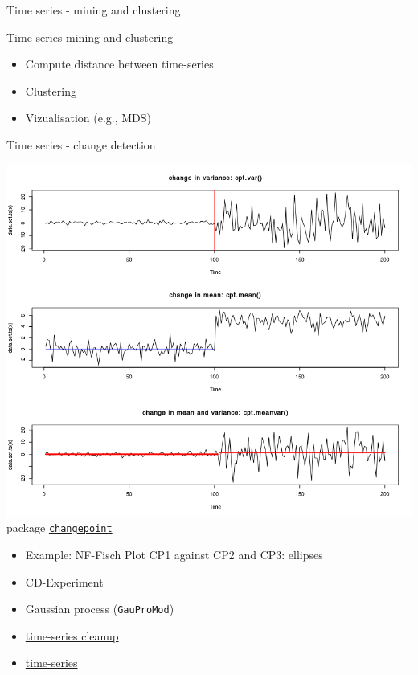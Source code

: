 \documentclass[9pt,ignorenonframetext,]{beamer}
\providecommand{\tightlist}{%
  \setlength{\itemsep}{0pt}\setlength{\parskip}{0pt}}
\begin{document}
\begin{frame}{Time series - mining and clustering}

\href{https://rdatamining.wordpress.com/2011/08/23/time-series-analysis-and-mining-with-r/}{Time
series mining and clustering}

\begin{itemize}
\tightlist
\item
  Compute distance between time-series
\item
  Clustering
\item
  Vizualisation (e.g., MDS)
\end{itemize}

\end{frame}

\begin{frame}[fragile]{Time series - change detection}

\includegraphics{imgPres/TS_changedetection.png} package
\href{https://cran.r-project.org/web/packages/changepoint}{\texttt{changepoint}}

\begin{itemize}
\tightlist
\item
  Example: NF-Fisch Plot CP1 against CP2 and CP3: ellipses
\item
  CD-Experiment
\item
  Gaussian process (\texttt{GauProMod})
\item
  \href{https://cran.r-project.org/web/packages/waterData/vignettes/vignette.pdf}{time-series
  cleanup}
\item
  \href{http://www.css.cornell.edu/faculty/dgr2/teach/R/R_ts.pdf}{time-series}
\end{itemize}

\end{frame}
\end{document}
